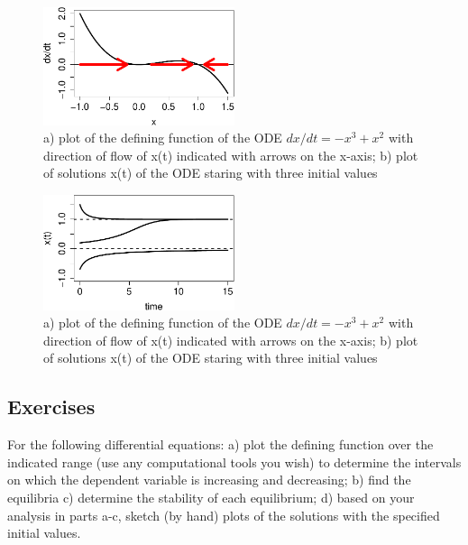 \documentclass[
  letterpaper,
  DIV=11,
  numbers=noendperiod]{scrreprt}
\begin{document}
\begin{figure}

{\centering \includegraphics[width=0.5\textwidth,height=\textheight]{./graph_odes_files/figure-pdf/ch7-flow3-1.pdf}

}

\caption{a) plot of the defining function of the ODE
\(dx/dt = -x^3 + x^2\) with direction of flow of x(t) indicated with
arrows on the x-axis; b) plot of solutions x(t) of the ODE staring with
three initial values}

\end{figure}

\begin{figure}

{\centering \includegraphics[width=0.5\textwidth,height=\textheight]{./graph_odes_files/figure-pdf/ch7-flow3-2.pdf}

}

\caption{a) plot of the defining function of the ODE
\(dx/dt = -x^3 + x^2\) with direction of flow of x(t) indicated with
arrows on the x-axis; b) plot of solutions x(t) of the ODE staring with
three initial values}

\end{figure}

\hypertarget{exercises-21}{%
\subsection{Exercises}\label{exercises-21}}

For the following differential equations: a) plot the defining function
over the indicated range (use any computational tools you wish) to
determine the intervals on which the dependent variable is increasing
and decreasing; b) find the equilibria c) determine the stability of
each equilibrium; d) based on your analysis in parts a-c, sketch (by
hand) plots of the solutions with the specified initial values.
\end{document}
